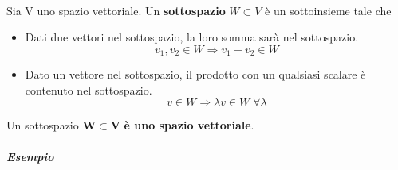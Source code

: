 \documentclass[a4paper, 12pt]{report}
\begin{document}
                \paragraph{}Sia V uno spazio vettoriale. Un \textbf{sottospazio} $W \subset V$ è
                un sottoinsieme tale che
                    \begin{itemize}
                        \item Dati due vettori nel sottospazio, la loro somma sarà nel sottospazio. $$v_1,v_2 \in W \Rightarrow v_1+v_2 \in W$$
                        \item Dato un vettore nel sottospazio, il prodotto con un qualsiasi scalare è contenuto nel sottospazio. $$v \in W \Rightarrow \lambda v \in W \; \forall \lambda$$
                    \end{itemize} 
                Un sottospazio $\boldsymbol{W \subset V}$ \textbf{è uno spazio vettoriale}.
                \subparagraph{Esempio}
\end{document}
